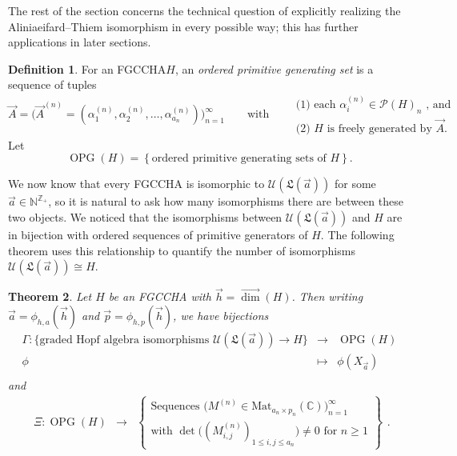 \documentclass[11pt]{amsart}
\newtheorem{theorem}{Theorem}[section]
\theoremstyle{definition}
\newtheorem{definition}[theorem]{Definition}
\numberwithin{equation}{section}
\def\NN{{\mathbb N}}
\def\CC{{\mathbb C}}
\def\ZZ{{\mathbb Z}}
\newcommand{\FGCCHA}{\textsf{FGCCHA}\xspace}
\newcommand{\vecdim}{\overrightarrow{\dim}}
\newcommand{\OPG}{\operatorname{OPG}}
\newcommand{\lucas}[1]{\todo[size=\tiny,color=red!50]{#1 \\ \hfill --- Lucas}}
\begin{document}
The rest of the section concerns the technical question of explicitly realizing the Aliniaeifard--Thiem isomorphism in every possible way; this has further applications in later sections.

\begin{definition}
\label{def:OPG}
For an \FGCCHA $H$, an \emph{ordered primitive generating set} is a sequence of tuples
\[
\vec{A} = \Big(\vec{A}^{(n)} = (\alpha_{1}^{(n)}, \alpha_{2}^{(n)}, \ldots, \alpha_{a_{n}}^{(n)})\Big)_{n = 1}^{\infty}
\qquad\text{with}\qquad
\begin{array}{l}
\text{(1) each $\alpha_{i}^{(n)} \in \mathcal{P}(H)_{n}$ , and} \\
\text{(2) $H$ is freely generated by $\vec{A}$.}
\end{array}
\]
Let
\[
\OPG(H) = \left\{ \text{ordered primitive generating sets of $H$} \right\}.
\]
\end{definition}

We now know that every \FGCCHA is isomorphic to $\mathcal{U}(\mathfrak{L}(\vec{a}))$ for some $\vec{a} \in \NN^{\ZZ_{+}}$, so it is natural to ask how many isomorphisms there are between these two objects.  
We noticed that the isomorphisms between $\mathcal{U}(\mathfrak{L}(\vec{a}))$ and $H$ are in bijection with ordered sequences of primitive generators of $H$.  
The following theorem uses this relationship to quantify the number of isomorphisms  $\mathcal{U}(\mathfrak{L}(\vec{a})) \cong H$.

\begin{theorem}
\label{thm:OPGmaps}
Let $H$ be an \FGCCHA with $\vec{h} = \vecdim(H)$.  Then writing $\vec{a} = \phi_{h, a}(\vec{h})$ and $\vec{p} = \phi_{h, p}(\vec{h})$, we have bijections
\[
\begin{array}{rcl}
\Gamma: \{\text{graded Hopf algebra isomorphisms $\mathcal{U}(\mathfrak{L}(\vec{a})) \to H$}\} & \to & \OPG(H) \\
\phi & \mapsto & \phi(X_{\vec{a}}) \\
\end{array}
\]
and %
\[
\begin{array}{rcl}
\Xi: \OPG(H) &\to& \left\{ \begin{array}{c}
\text{Sequences $\big(M^{(n)} \in \mathrm{Mat}_{a_{n} \times p_{n}}(\CC)\big)_{n=1}^{\infty}$ } \\
\text{with $\det\big( (M^{(n)}_{i, j})_{1 \le i, j \le a_{n}} \big) \neq 0$ for $n \ge 1$}
\end{array}\right\}
\end{array}.
\]
\end{theorem}
\end{document}
